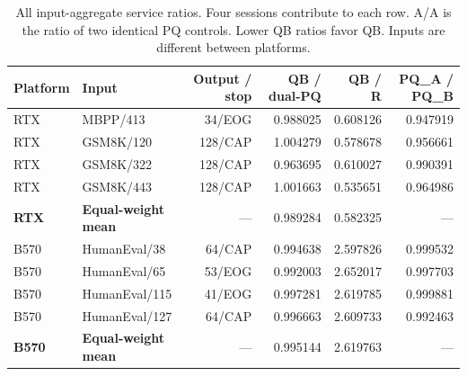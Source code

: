\begin{table}[t]\centering\small
\caption{All input-aggregate service ratios. Four sessions contribute to each row. A/A is the ratio of two identical PQ controls. Lower QB ratios favor QB. Inputs are different between platforms.}\label{tab:serviceinputs}
\begin{tabular}{@{}llrrrr@{}}\toprule
Platform & Input & Output / stop & QB / dual-PQ & QB / R & PQ\_A / PQ\_B\\\midrule
RTX & MBPP/413 & 34/EOG & 0.988025 & 0.608126 & 0.947919\\
RTX & GSM8K/120 & 128/CAP & 1.004279 & 0.578678 & 0.956661\\
RTX & GSM8K/322 & 128/CAP & 0.963695 & 0.610027 & 0.990391\\
RTX & GSM8K/443 & 128/CAP & 1.001663 & 0.535651 & 0.964986\\
\textbf{RTX} & \textbf{Equal-weight mean} & --- & 0.989284 & 0.582325 & ---\\\midrule
B570 & HumanEval/38 & 64/CAP & 0.994638 & 2.597826 & 0.999532\\
B570 & HumanEval/65 & 53/EOG & 0.992003 & 2.652017 & 0.997703\\
B570 & HumanEval/115 & 41/EOG & 0.997281 & 2.619785 & 0.999881\\
B570 & HumanEval/127 & 64/CAP & 0.996663 & 2.609733 & 0.992463\\
\textbf{B570} & \textbf{Equal-weight mean} & --- & 0.995144 & 2.619763 & ---\\\bottomrule
\end{tabular}
\end{table}
